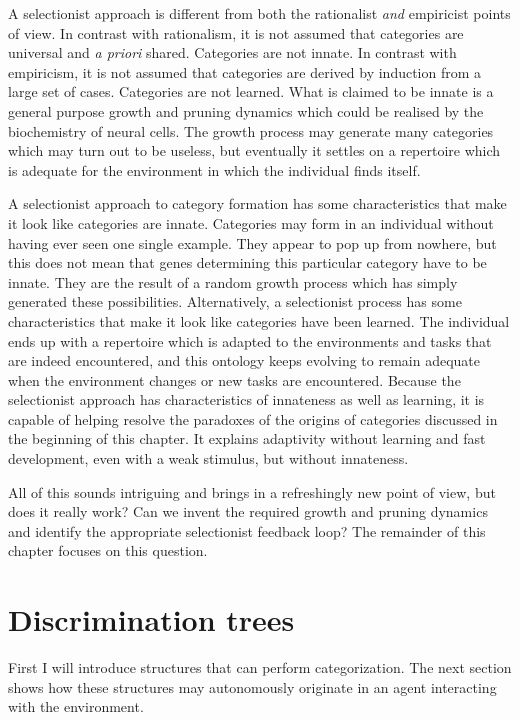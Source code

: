 A selectionist approach is different from 
both the rationalist {\itshape and} empiricist points of view.
In contrast with rationalism, it is not assumed that categories are
universal and {\itshape a priori} shared. Categories are not innate. 
In contrast with empiricism, it is not assumed that 
categories are derived by induction from a large 
set of cases. Categories are not learned. What is 
claimed to be innate is a general purpose growth and pruning
dynamics which could be realised by the biochemistry of
neural cells. The growth process may generate many categories 
which may turn out to 
be useless, but eventually it settles on a repertoire
which is adequate for the environment in which the 
individual finds itself. 

A selectionist approach to category formation has some 
characteristics that make it look like categories are 
innate. Categories may form in an individual
without having ever seen one single example. They
appear to pop up from nowhere, but this does not 
mean that genes determining this particular category have 
to be innate. They are the result of a random growth process
which has simply generated these possibilities. 
Alternatively, a selectionist process has some characteristics
that make it look like categories have been learned.
The individual ends up with a repertoire
which is adapted to 
the environments and tasks that are indeed encountered, and 
this ontology keeps evolving to remain adequate when 
the environment changes or new tasks are encountered. 
Because the selectionist approach has characteristics
of innateness as well as learning, it is capable of helping
resolve the 
paradoxes of the origins of categories discussed in the 
beginning of this chapter.  
It explains adaptivity without learning and fast 
development, even with a weak stimulus, but without innateness. 

All of this sounds intriguing and brings in a refreshingly new 
point of view, but does it really work? Can we 
invent the required growth and pruning dynamics and 
identify the appropriate selectionist feedback loop? 
The remainder of this chapter focuses on this question. 

\section{Discrimination trees}

First I will introduce structures that can perform
categorization. The next section shows how these
structures may autonomously originate in an agent
interacting with the environment. %

